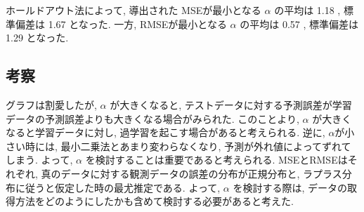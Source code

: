 \documentclass{jsarticle}
\begin{document}
ホールドアウト法によって, 導出された MSEが最小となる $\alpha$ の平均は 1.18 , 
標準偏差は 1.67 となった.
一方, RMSEが最小となる $\alpha$ の平均は 0.57 , 標準偏差は 1.29 となった. 




\subsection{考察}
グラフは割愛したが, $\alpha$ が大きくなると, テストデータに対する予測誤差が学習データの予測誤差よりも大きくなる場合がみられた.
このことより, $\alpha$ が大きくなると学習データに対し, 過学習を起こす場合があると考えられる.
逆に, $\alpha$が小さい時には, 最小二乗法とあまり変わらなくなり, 予測が外れ値によってずれてしまう.
よって, $\alpha$ を検討することは重要であると考えられる. 
MSEとRMSEはそれぞれ, 真のデータに対する観測データの誤差の分布が正規分布と, ラプラス分布に従うと仮定した時の最尤推定である.
よって, $\alpha$ を検討する際は, データの取得方法をどのようにしたかも含めて検討する必要があると考えた. 
\end{document}

